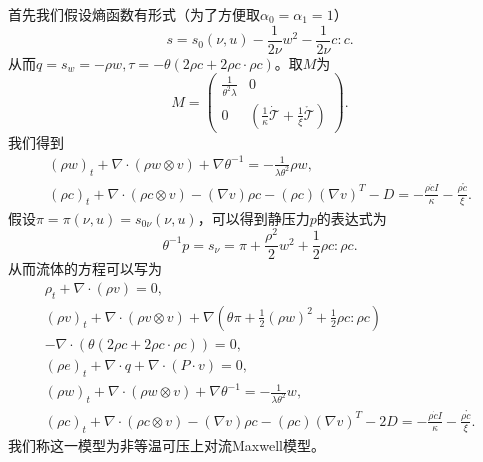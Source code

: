 	首先我们假设熵函数有形式（为了方便取$\alpha_0=\alpha_1=1$）
	\begin{equation*}
			s = s_0(\nu,u)  - \frac{1}{2 \nu } w^2 - \frac{1}{2  \nu } c:c.
	\end{equation*}
	从而$q=s_w=-{\rho w},\tau = - \theta (2 \rho c + 2 \rho c \cdot \rho c)$。取$M$为
	\begin{equation*}
		M = \left( \begin{array}{ccc} 
			\frac{1}{\theta^2 \lambda} & 0 \\
			0 &  (\frac{1}{\kappa}\dot{\mathcal{T}}  +  \frac{1}{\xi}\mathring{\mathcal{T}}  )
		\end{array} \right).
	\end{equation*}
	我们得到
\begin{eqnarray*}
			(\rho w)_t +  \nabla \cdot (\rho w \otimes v)  + \nabla \theta^{-1} = -\frac{1}{\lambda \theta^2}  \rho w, \\
			(\rho c)_t +  \nabla \cdot (\rho c \otimes v) - (\nabla v) \rho c - (\rho c) (\nabla v)^T - D = - \frac{\rho \dot{c}I}{\kappa} -  \frac{\rho \mathring{c}}{\xi} .
\end{eqnarray*}
假设$\pi=\pi(\nu,u) = s_{0\nu}(\nu,u)$，可以得到静压力$p$的表达式为
\begin{equation*}
			\theta^{-1} p = s_\nu = \pi +\frac{\rho^2}{2} w^2 + \frac{1}{2} \rho c: \rho c.
\end{equation*}
从而流体的方程可以写为
\begin{subequations} \label{eq:ECDFsecond}
		\begin{align}
			\rho_t + \nabla \cdot (\rho v) = 0 ,\\
			(\rho v)_t + \nabla \cdot (\rho v \otimes v) + \nabla (\theta\pi +\frac{1}{2} (\rho w)^2 + \frac{1}{2} \rho c: \rho c) \nonumber \\
			 - \nabla \cdot (\theta (2 \rho c + 2 \rho c \cdot \rho c)) =0 ,\\
			(\rho e)_t + \nabla \cdot q + \nabla \cdot (P \cdot v) = 0, \\
			(\rho w)_t + \nabla \cdot (\rho w \otimes v) + \nabla \theta^{-1} = -\frac{1}{\lambda \theta^2} w, \\
			(\rho c)_t +  \nabla \cdot (\rho c \otimes v) - (\nabla v) \rho c - (\rho c) (\nabla v)^T - 2 D = - \frac{\rho \dot{c}I}{\kappa} -  \frac{\rho \mathring{c}}{\xi}  .
		\end{align}
	\end{subequations}
	我们称这一模型为非等温可压上对流Maxwell模型。

